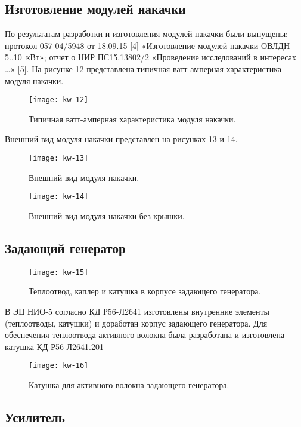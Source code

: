 \subsection{Изготовление модулей накачки}

По результатам разработки и изготовления модулей накачки были выпущены: протокол 057-04/5948 от 18.09.15 [4] «Изготовление модулей накачки ОВЛДН 5..10~кВт»; отчет о НИР ПС15.13802/2 «Проведение исследований в интересах …» [5].
На рисунке 12 представлена типичная ватт-амперная характеристика модуля накачки.
\begin{figure}
  \centering
  \texttt{[image: kw-12]}
  \caption{Типичная ватт-амперная характеристика модуля накачки.}
  \label{img:kw-12}
\end{figure}

Внешний вид модуля накачки представлен на рисунках 13 и 14.
\begin{figure}
  \centering
  \texttt{[image: kw-13]}
  \caption{Внешний вид модуля накачки.}
  \label{img:kw-13}
\end{figure}
\begin{figure}
  \centering
  \texttt{[image: kw-14]}
  \caption{Внешний вид модуля накачки без крышки.}
  \label{img:kw-14}
\end{figure}


\subsection{Задающий генератор}

\begin{figure}
  \centering
  \texttt{[image: kw-15]}
  \caption{Теплоотвод, каплер и катушка в корпусе задающего генератора.}
  \label{img:kw-15}
\end{figure}

В ЭЦ НИО-5 согласно КД Р56-Л2641 изготовлены внутренние элементы (теплоотводы, катушки) и доработан корпус задающего генератора. Для обеспечения теплоотвода активного волокна была разработана и изготовлена катушка КД Р56-Л2641.201
\begin{figure}
  \centering
  \texttt{[image: kw-16]}
  \caption{Катушка для активного волокна задающего генератора.}
  \label{img:kw-16}
\end{figure}


\subsection{Усилитель}

